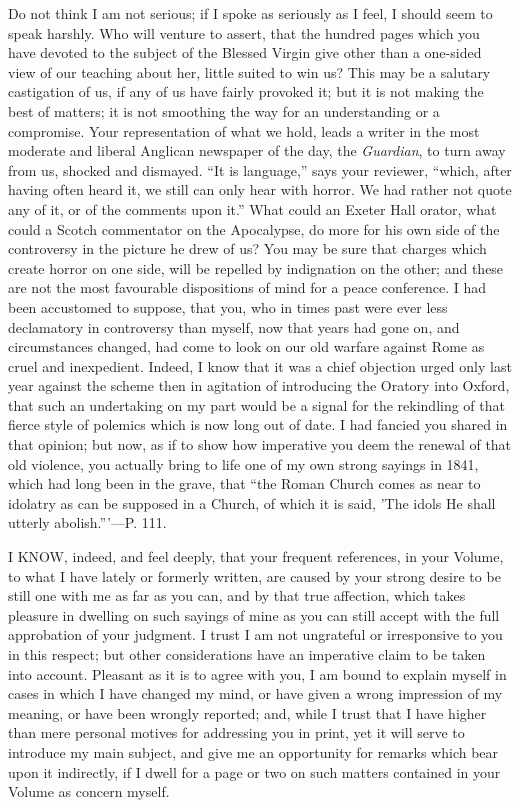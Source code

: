 Do not think I am not serious; if I spoke as seriously as I feel, I
should seem to speak harshly. Who will venture to assert, that the
hundred pages which you have devoted to the subject of the Blessed
Virgin give other than a one-sided view of our teaching about her,
little suited to win us? This may be a salutary castigation of us, if
any of us have fairly provoked it; but it is not making the best of
matters; it is not smoothing the way for an understanding or a
compromise. Your representation of what we hold, leads a writer in the
most moderate and liberal Anglican newspaper of the day, the \emph{Guardian},
to turn away from us, shocked and dismayed. ``It is language,''
says your reviewer, ``which, after having often heard it, we still
can only hear with horror. We had rather not quote any of it, or of the
comments upon it.'' What could an Exeter Hall orator, what could a
Scotch commentator on the Apocalypse, do more for his own side of the
controversy in the picture he drew of us? You may be sure that charges
which create horror on one side, will be repelled by indignation on the
other; and these are not the most favourable dispositions of mind for a
peace conference. I had been accustomed to suppose, that you, who in
times past were ever less declamatory in controversy than myself,
now that years had gone on, and circumstances changed, had come to look
on our old warfare against Rome as cruel and inexpedient. Indeed, I know
that it was a chief objection urged only last year against the scheme
then in agitation of introducing the Oratory into Oxford, that such an
undertaking on my part would be a signal for the rekindling of that
fierce style of polemics which is now long out of date. I had fancied
you shared in that opinion; but now, as if to show how imperative you
deem the renewal of that old violence, you actually bring to life one of
my own strong sayings in 1841, which had long been in the grave, that
``the Roman Church comes as near to idolatry as can be supposed in a
Church, of which it is said, 'The idols He shall utterly abolish.'''—P.
111.


I KNOW, indeed, and feel deeply, that your frequent references,
in your Volume, to what I have lately or formerly written, are caused by
your strong desire to be still one with me as far as you can, and by
that true affection, which takes pleasure in dwelling on such sayings of
mine as you can still accept with the full approbation of your judgment.
I trust I am not ungrateful or irresponsive to you in this respect; but
other considerations have an imperative claim to be taken into account.
Pleasant as it is to agree with you, I am bound to explain myself in
cases in which I have changed my mind, or have given a wrong impression
of my meaning, or have been wrongly reported; and, while I trust that I
have higher than mere personal motives for addressing you in print, yet
it will serve to introduce my main subject, and give me an opportunity
for remarks which bear upon it indirectly, if I dwell for a page or two
on such matters contained in your Volume as concern myself.

